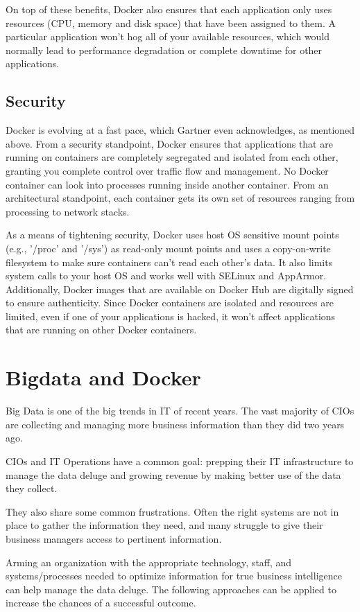 \documentclass[sigconf]{acmart}
\begin{document}
	On top of these benefits, Docker also ensures that each application only uses resources (CPU, memory and disk space) that have been assigned to them. A particular application won't hog all of your available resources, which would normally lead to performance degradation or complete downtime for other applications.
	\subsection{Security}
	Docker is evolving at a fast pace, which Gartner even acknowledges, as mentioned above. From a security standpoint, Docker ensures that applications that are running on containers are completely segregated and isolated from each other, granting you complete control over traffic flow and management. No Docker container can look into processes running inside another container. From an architectural standpoint, each container gets its own set of resources ranging from processing to network stacks.\cite{Docker_Security}
	
	As a means of tightening security, Docker uses host OS sensitive mount points (e.g., '/proc' and '/sys') as read-only mount points and uses a copy-on-write filesystem to make sure containers can't read each other's data. It also limits system calls to your host OS and works well with SELinux and AppArmor. Additionally, Docker images that are available on Docker Hub are digitally signed to ensure authenticity. Since Docker containers are isolated and resources are limited, even if one of your applications is hacked, it won't affect applications that are running on other Docker containers.
	\section{Bigdata and Docker}
	
	Big Data is one of the big trends in IT of recent years. The vast majority of CIOs are collecting and managing more business information than they did two years ago.
	
	CIOs and IT Operations have a common goal: prepping their IT infrastructure to manage the data deluge and growing revenue by making better use of the data they collect.
	
	They also share some common frustrations. Often the right systems are not in place to gather the information they need, and many struggle to give their business managers access to pertinent information.
	
	Arming an organization with the appropriate technology, staff, and systems/processes needed to optimize information for true business intelligence can help manage the data deluge. The following approaches can be applied to increase the chances of a successful outcome.
\end{document}
